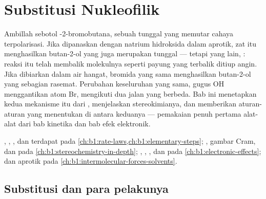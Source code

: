 \chapter{Substitusi Nukleofilik}\label{ch:b1:nucleophilic-substitution}

Ambillah sebotol -2-bromobutana, sebuah  tunggal yang
memutar cahaya terpolarisasi. Jika dipanaskan dengan natrium hidroksida
dalam  aprotik, zat itu menghasilkan butan-2-ol yang juga
merupakan  tunggal --- tetapi  yang lain, :
reaksi itu telah membalik molekulnya seperti payung yang terbalik
ditiup angin. Jika dibiarkan dalam air hangat, bromida yang sama
menghasilkan butan-2-ol yang sebagian rasemat. Perubahan keseluruhan yang
sama, gugus OH menggantikan atom Br, mengikuti dua jalan yang berbeda.
Bab ini menetapkan kedua mekanisme itu dari , menjelaskan
stereokimianya, dan memberikan aturan-aturan yang menentukan di antara
keduanya --- pemakaian penuh pertama alat-alat dari bab kinetika dan bab
efek elektronik.

\begin{recall}
, , , dan  terdapat pada \cref{ch:b1:rate-laws,ch:b1:elementary-steps};
, gambar Cram, dan  pada
\cref{ch:b1:stereochemistry-in-depth}; , , ,
dan  pada \cref{ch:b1:electronic-effects};  dan
aprotik pada \cref{ch:b1:intermolecular-forces-solvents}.
\end{recall}

\section{Substitusi dan para pelakunya}

